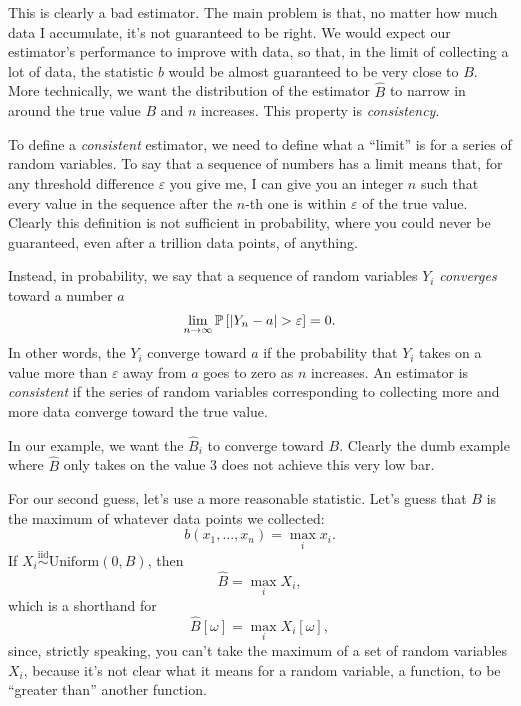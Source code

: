 This is clearly a bad estimator. The main problem is that, no matter how much
data I accumulate, it's not guaranteed to be right. We would expect our
estimator's performance to improve with data, so that, in the limit of
collecting a lot of data, the statistic $b$ would be almost guaranteed to be
very close to $B$. More technically, we want the distribution of the estimator
$\hat{B}$ to narrow in around the true value $B$ and $n$ increases. This
property is \emph{consistency}.

To define a \emph{consistent} estimator, we need to define what a ``limit'' is
for a series of random variables. To say that a sequence of numbers has a limit means that, for any threshold difference
$\varepsilon$ you give me, I can give you an integer $n$ such that every value
in the sequence after the $n$-th one is within $\varepsilon$ of the true value.
Clearly this definition is not sufficient in probability, where you could never
be guaranteed, even after a trillion data points, of anything.

Instead, in probability, we say that a sequence of random variables $Y_i$
\emph{converges} toward a number $a$
\begin{equation}
\lim_{n \to \infty} \mathbb{P}\left[{|Y_n - a| > \varepsilon}\right] = 0.
\end{equation}
In other words, the $Y_i$ converge toward $a$ if the probability that $Y_i$
takes on a value more than $\varepsilon$ away from $a$ goes to zero as $n$
increases. An estimator is \emph{consistent} if the series of random variables
corresponding to collecting more and more data converge toward the true value.

In our example, we want the $\hat{B}_i$ to converge toward $B$. Clearly the
dumb example where $\hat{B}$ only takes on the value 3 does not achieve this
very low bar.

For our second guess, let's use a more reasonable statistic. Let's guess that $B$
is the maximum of whatever data points we collected:
\begin{equation*}
    b(x_1, \ldots, x_n) = \max_i x_i.
\end{equation*}
If $X_i \stackrel{\text{iid}}{\sim} \text{Uniform}(0, B)$, then
\begin{equation*}
    \hat{B} = \max_i X_i,
\end{equation*}
which is a shorthand for
\begin{equation*}
    \hat{B}[\omega] = \max_i X_i[\omega],
\end{equation*}
since, strictly speaking, you can't take the maximum of a set of random
variables $X_i$, because it's not clear what it means for a random variable, a
function, to be ``greater than'' another function.

